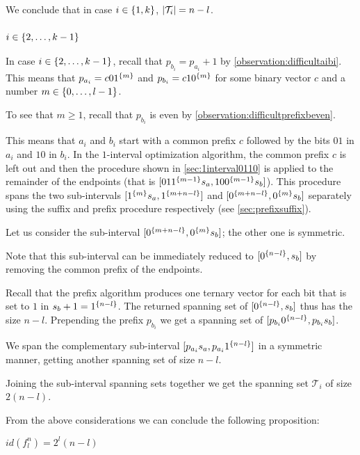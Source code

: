 We conclude that in case $i \in \{1, k\}$,
$\lvert\mathcal{T}_i\rvert = n-l$.

\subsubsection{$i \in \{2, \ldots, k-1\}$}

In case $i \in \{2, \ldots, k-1\}$,
recall that $p_{b_i} = p_{a_i} + 1$
by \cref{observation:difficultaibi}.
This means that $p_{a_i} = c 0 1^{\{m\}}$
and $p_{b_i} = c 1 0^{\{m\}}$
for some binary vector $c$
and a number $m \in \{0, \ldots, l-1\}$.

To see that $m \geq 1$,
recall that $p_{b_i}$ is even
by \cref{observation:difficultprefixbeven}.

This means that $a_i$ and $b_i$
start with a common prefix $c$
followed by the bits $01$ in $a_i$
and $10$ in $b_i$.
In the $1$-interval optimization algorithm,
the common prefix $c$ is left out
and then the procedure
shown in \cref{sec:1interval0110}
is applied to the remainder of the endpoints
(that is
$[01 1^{\{m-1\}} s_a, 10 0^{\{m-1\}} s_b]$).
This procedure spans the two sub-intervals
$[1^{\{m\}} s_a, 1^{\{m+n-l\}}]$
and $[0^{\{m+n-l\}}, 0^{\{m\}} s_b]$
separately using the suffix and prefix procedure
respectively
(see \cref{sec:prefixsuffix}).

Let us consider the sub-interval
$[0^{\{m+n-l\}}, 0^{\{m\}} s_b]$;
the other one is symmetric.

Note that this sub-interval can be immediately reduced
to $[0^{\{n-l\}}, s_b]$
by removing the common prefix of the endpoints.

Recall that the prefix algorithm
produces one ternary vector
for each bit that is set to $1$
in $s_b + 1 = 1^{\{n-l\}}$.
The returned spanning set of
$[0^{\{n-l\}}, s_b]$
thus has the size $n-l$.
Prepending the prefix $p_{b_i}$
we get a spanning set of
$[p_{b_i} 0^{\{n-l\}}, p_{b_i} s_b]$.

We span the complementary sub-interval
$[p_{a_i} s_a, p_{a_i} 1^{\{n-l\}}]$
in a symmetric manner,
getting another spanning set of size $n-l$.

Joining the sub-interval spanning sets together
we get the spanning set $\mathcal{T}_i$ of size $2(n-l)$.

\hfill

From the above considerations
we can conclude the following proposition:
\begin{lemma}
\label{lemma:difficultid}
$\mathit{id}(f_l^n) = 2^l(n-l)$
\end{lemma}

